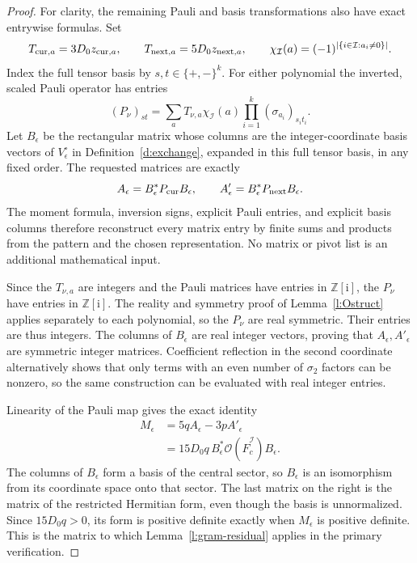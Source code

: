 \begin{proof}
For clarity, the remaining Pauli and basis transformations also
have exact entrywise formulas.  Set
\[
 T_{{\rm cur},a}=3D_0z_{{\rm cur},a},\qquad
 T_{{\rm next},a}=5D_0z_{{\rm next},a},\qquad
 \chi_{\mathcal I}(a)=(-1)^{|\{i\in\mathcal I:a_i\ne0\}|}.
\]
Index the full tensor basis by
\(s,t\in\{+,-\}^k\).  For either polynomial the inverted,
scaled Pauli operator has entries
\[
 (P_\nu)_{st}=\sum_a
       T_{\nu,a}\chi_{\mathcal I}(a)
                         \prod_{i=1}^k(\sigma_{a_i})_{s_i t_i}.
\]
Let \(B_\epsilon\) be the rectangular matrix whose columns are
the integer-coordinate basis vectors of \(V_\epsilon^\circ\)
in Definition~\ref{d:exchange}, expanded in this full tensor
basis, in any fixed order.  The requested matrices are exactly
\[
 A_\epsilon=B_\epsilon^*P_{\rm cur}B_\epsilon,
 \qquad A'_\epsilon=B_\epsilon^*P_{\rm next}B_\epsilon.
\]
The moment formula, inversion signs, explicit Pauli entries, and
explicit basis columns therefore reconstruct every matrix entry
by finite sums and products from the pattern and the chosen
representation.  No matrix or pivot list is an additional
mathematical input.

Since the \(T_{\nu,a}\) are integers and the Pauli matrices
have entries in \(\mathbb Z[\mathrm i]\), the \(P_\nu\) have
entries in \(\mathbb Z[\mathrm i]\).  The reality and symmetry
proof of Lemma~\ref{l:Ostruct} applies separately to each
polynomial, so the \(P_\nu\) are real symmetric.  Their entries
are thus integers.  The columns of \(B_\epsilon\) are real
integer vectors, proving that \(A_\epsilon,A'_\epsilon\) are
symmetric integer matrices.  Coefficient reflection in the
second coordinate alternatively shows that only terms with
an even number of \(\sigma_2\) factors can be nonzero, so the
same construction can be evaluated with real integer entries.

Linearity of the Pauli map gives the exact identity
\begin{align*}
 M_\epsilon
 &=5qA_\epsilon-3pA'_\epsilon\\
 &=15D_0q\,B_\epsilon^*
                \mathcal O(\widehat F_c^{\mathcal I})B_\epsilon.
\end{align*}
The columns of \(B_\epsilon\) form a basis of the central sector,
so \(B_\epsilon\) is an isomorphism from its coordinate space
onto that sector.  The last matrix on the right is the matrix
of the restricted Hermitian form, even though the basis is
unnormalized.  Since \(15D_0q>0\), its form is positive definite
exactly when \(M_\epsilon\) is positive definite.  This is the
matrix to which Lemma~\ref{l:gram-residual} applies in the primary
verification.


\end{proof}
